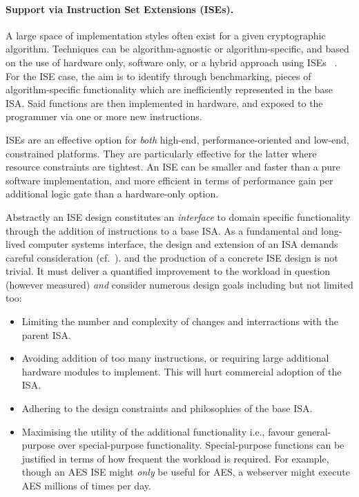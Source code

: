 
\paragraph{Support via Instruction Set Extensions (ISEs).}

A large space of implementation styles often exist
for a given cryptographic algorithm.
Techniques can be
   algorithm-agnostic
   or
   algorithm-specific,
and based on the use of   
   hardware              only,
                software only,
   or
   a hybrid approach using ISEs ~\cite{GalBer:11,BarGioMar:09,RegIen:16}.
For the ISE case, the aim is to identify through benchmarking, pieces of
algorithm-specific functionality which are inefficiently represented in the
base ISA.
Said functions are then implemented in hardware, and exposed to the
programmer via one or more new instructions.

ISEs are an effective option for {\em both}
high-end, performance-oriented
and
 low-end, constrained
platforms. 
They are particularly effective for the latter where resource constraints
are tightest.
An ISE can be smaller and faster than a pure software implementation,
and more efficient in terms of performance gain per additional logic gate
than a hardware-only option.

Abstractly an ISE design constitutes
an {\em interface} to domain specific functionality through the
addition of instructions to a base ISA.
As a fundamental and long-lived computer systems interface, the design
and extension of an ISA demands careful consideration
(cf.~\cite[Section 4]{Gueron:09}). 
and the production of a concrete ISE design is not trivial.
It must deliver a quantified improvement to the workload in 
question (however measured) {\em and}
consider numerous design goals including but not limited too:

\begin{itemize}
\item Limiting the number and complexity of changes and interractions with the
    parent ISA.
\item Avoiding addition of too many instructions, or requiring large
    additional hardware modules to implement. This will hurt commercial
    adoption of the ISA.
\item Adhering to the design constraints and philosophies of the base ISA.
\item Maximising the utility of the additional functionality
      i.e.,
      favour general-purpose over special-purpose functionality.
      Special-purpose functions can be justified in terms of how frequent
      the workload is required.
      For example, though an AES ISE might {\em only}
      be useful for AES, a webserver might execute AES millions of times
      per day.
\end{itemize}

